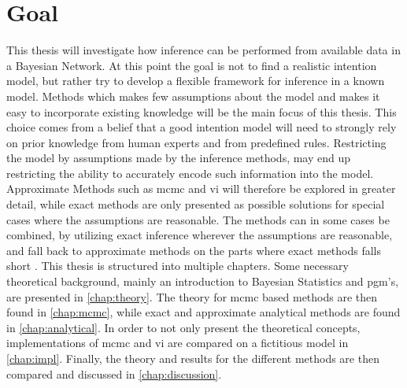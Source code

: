 \section{Goal}
This thesis will investigate how inference can be performed from available data in a Bayesian Network. At this point the goal is not to find a realistic intention model, but rather try to develop a flexible framework for inference in a known model. Methods which makes few assumptions about the model and makes it easy to incorporate existing knowledge will be the main focus of this thesis. This choice comes from a belief that a good intention model will need to strongly rely on prior knowledge from human experts and from predefined rules. Restricting the model by assumptions made by the inference methods, may end up restricting the ability to accurately encode such information into the model. Approximate Methods such as \acrfull{mcmc} and \acrfull{vi} will therefore be explored in greater detail, while exact methods are only presented as possible solutions for special cases where the assumptions are reasonable. The methods can in some cases be combined, by utilizing exact inference wherever the assumptions are reasonable, and fall back to approximate methods on the parts where exact methods falls short \cite{winnbishop}.
This thesis is structured into multiple chapters. Some necessary theoretical background, mainly an introduction to Bayesian Statistics and \acrfull{pgm}'s, are presented in \cref{chap:theory}. The theory for \acrshort{mcmc} based methods are then found in \cref{chap:mcmc}, while exact and approximate analytical methods are found in \cref{chap:analytical}. In order to not only present the theoretical concepts, implementations of \acrshort{mcmc} and \acrshort{vi} are compared on a fictitious model in \cref{chap:impl}. Finally, the theory and results for the different methods are then compared and discussed in \cref{chap:discussion}.